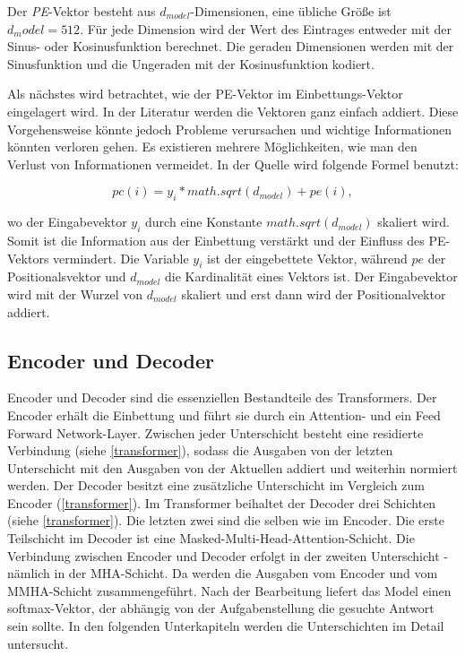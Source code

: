 Der \textit{PE}-Vektor besteht aus $d_{model}$-Dimensionen, eine übliche Größe ist $d_model=512$. Für jede Dimension wird der Wert des Eintrages entweder mit der Sinus- oder Kosinusfunktion berechnet. Die geraden Dimensionen werden mit der Sinusfunktion und die Ungeraden mit der Kosinusfunktion kodiert.

Als nächstes wird betrachtet, wie der PE-Vektor im Einbettungs-Vektor eingelagert wird. In der Literatur werden die Vektoren ganz einfach addiert. Diese Vorgehensweise könnte jedoch Probleme verursachen und wichtige Informationen könnten verloren gehen. Es existieren mehrere Möglichkeiten, wie man den Verlust von Informationen vermeidet. In der Quelle \cite{denis_Transformer:02} wird folgende Formel benutzt:

\begin{equation}
	pc(i) = y_i*math.sqrt(d_{model}) + pe(i),
\end{equation}

wo der Eingabevektor $y_i$ durch eine Konstante $math.sqrt(d_{model})$ skaliert wird. Somit ist die Information aus der Einbettung verstärkt und der Einfluss des PE-Vektors vermindert. Die Variable $y_i$ ist der eingebettete Vektor, während $pe$ der Positionalsvektor und $d_{model}$ die Kardinalität eines Vektors ist. Der Eingabevektor wird mit der Wurzel von $d_{model}$ skaliert und erst dann wird der Positionalvektor addiert.

\subsection{Encoder und Decoder}

Encoder und Decoder sind die essenziellen Bestandteile des Transformers. Der Encoder erhält die Einbettung und führt sie durch ein Attention- und ein Feed Forward Network-Layer. Zwischen jeder Unterschicht besteht eine residierte Verbindung (siehe \cref{transformer}), sodass die Ausgaben von der letzten Unterschicht mit den Ausgaben von der Aktuellen addiert und weiterhin normiert werden. Der Decoder besitzt eine zusätzliche Unterschicht im Vergleich zum Encoder (\cref{transformer}). Im Transformer beihaltet der Decoder drei Schichten (siehe \cref{transformer}). Die letzten zwei sind die selben wie im Encoder. Die erste Teilschicht im Decoder ist eine Masked-Multi-Head-Attention-Schicht. Die Verbindung zwischen Encoder und Decoder erfolgt in der zweiten Unterschicht - nämlich in der MHA-Schicht. Da werden die Ausgaben vom Encoder und vom MMHA-Schicht zusammengeführt. Nach der Bearbeitung liefert das Model einen softmax-Vektor, der abhängig von der Aufgabenstellung die gesuchte Antwort sein sollte. In den folgenden Unterkapiteln werden die Unterschichten im Detail untersucht.

